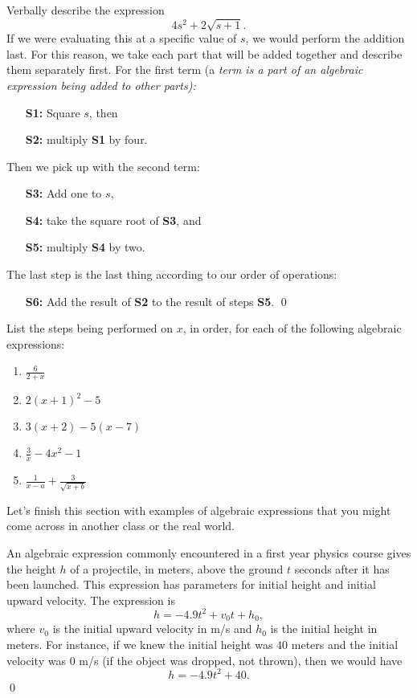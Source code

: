 \begin{eg} Verbally describe the expression
\[
4s^2 + 2\sqrt{s+1}.
\]
If we were evaluating this at a specific value of $s$, we would perform the addition last. For this reason, we take each part that will be added together and describe them separately first. For the first term (a \it{term }\normalfont is a part of an algebraic expression being added to other parts):
\begin{enumerate}
\item[\bf S1:] Square $s$, then
\item[\bf S2:] multiply {\bf S1} by four.
\end{enumerate}
Then we pick up with the second term:
\begin{enumerate}
\item[\bf S3:] Add one to $s$,
\item[\bf S4:] take the square root of {\bf S3}, and
\item[\bf S5:] multiply {\bf S4} by two.
\end{enumerate}
The last step is the last thing according to our order of operations:

\begin{enumerate}
\item[\bf S6:] Add the result of {\bf S2} to the result of steps {\bf S5}.  \qed
\end{enumerate}
\end{eg}

\begin{question} List the steps being performed on $x$, in order, for each of the following algebraic expressions:
\begin{enumerate}
\item $\frac{6}{2+x}$
\item $2(x+1)^2 -5$
\item $3(x+2)-5(x-7)$
\item $\frac{3}{x} - 4x^2 -1$
\item $\frac{1}{x-a}+\frac{3}{\sqrt{x+b}}$
\end{enumerate}
\end{question}

Let's finish this section with examples of algebraic expressions that you might come across in another class or the real world.

\par

\begin{eg} An algebraic expression commonly encountered in a first year physics course gives the height $h$ of a projectile, in meters, above the ground $t$ seconds after it has been launched. This expression has parameters for initial height and initial upward velocity. The expression is
\[
h = -4.9t^2+v_0 t + h_0,
\]
where $v_0$ is the initial upward velocity in m/s and $h_0$ is the initial height in meters. For instance, if we knew the initial height was $40$ meters and the initial velocity was $0$ m/s (if the object was dropped, not thrown), then we would have
\[
h = -4.9t^2 + 40.
\]
\qed  
  \end{eg}
\par 

